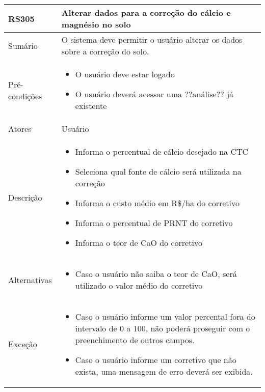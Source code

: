 \begin{quadro}[!htb]
    \begin{tabular}{|p{3cm}|p{11cm}|}
        \hline
        \textbf{RS305} & \textbf{Alterar dados para a correção do cálcio e magnésio no solo} \\
        \hline
        Sumário        & O sistema deve permitir o usuário alterar os dados sobre a correção do solo.                  \\
        \hline
        Pré-condições  & \begin{itemize}
            \item O usuário deve estar logado
            \item O usuário deverá acessar uma ??análise?? já existente 
        \end{itemize}                 \\
        \hline
        Atores         & Usuário                  \\
        \hline
        Descrição      &
        \begin{itemize}
            \item Informa o percentual de cálcio desejado na CTC
            \item Seleciona qual fonte de cálcio será utilizada na correção
            \item Informa o custo médio em R\$/ha do corretivo
            \item Informa o percentual de PRNT do corretivo
            \item Informa o teor de CaO do corretivo
        \end{itemize}                 \\
        \hline
        Alternativas   &
        \begin{itemize}
            \item Caso o usuário não saiba o teor de CaO, será utilizado o valor médio do corretivo
        \end{itemize}                 \\
        \hline
        Exceção        &
        \begin{itemize}
            \item Caso o usuário informe um valor percental fora do intervalo de 0 a 100, não poderá proseguir com o preenchimento de outros campos.
            \item Caso o usuário informe um corretivo que não exista, uma mensagem de erro deverá ser exibida.
        \end{itemize}                   \\
        \hline
    \end{tabular}
\end{quadro}

